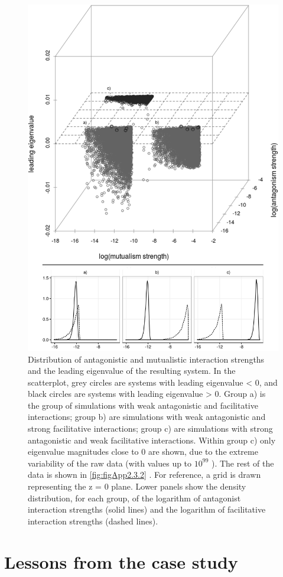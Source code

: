 \begin{figure}[!ht]
\centering
\includegraphics[width=.75\textwidth]{./Figures/chapter02/Fig_3.png}
\caption[Equal footing network analysis]{\color{Gray} Distribution of antagonistic and mutualistic interaction strengths and the leading eigenvalue of the resulting system. In the scatterplot, grey circles are systems with leading eigenvalue < 0, and black circles are systems with leading eigenvalue > 0. Group a) is the group of simulations with weak antagonistic and facilitative interactions; group b) are simulations with weak antagonistic and strong facilitative interactions; group c) are simulations with strong antagonistic and weak facilitative interactions. Within group c) only eigenvalue magnitudes close to 0 are shown, due to the extreme variability of the raw data (with values up to $10^99$ ). The rest of the data is shown in \cref{fig:figApp2.3.2} . For reference, a grid is drawn representing the z = 0 plane. Lower panels show the density distribution, for each group, of the logarithm of antagonist interaction strengths (solid lines) and the logarithm of facilitative interaction strengths (dashed lines).}
\label{fig:fig2.3}
\end{figure}


\section{Lessons from the case study}

